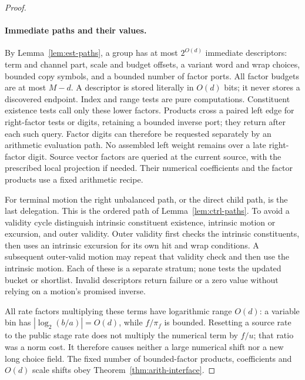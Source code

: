 \begin{proof}
\paragraph{Immediate paths and their values.}
By Lemma~\ref{lem:est-paths}, a group has at most $2^{O(d)}$ immediate
descriptors: term and channel part, scale and budget offsets, a variant
word and wrap choices, bounded copy symbols, and a bounded number of
factor ports.  All factor budgets are at most $M-d$.  A descriptor is
stored literally in $O(d)$ bits; it never stores a discovered endpoint.
Index and range tests are pure computations.  Constituent existence
tests call only these lower factors.  Products cross a paired left
edge for right-factor tests or digits, retaining a bounded inverse
port; they return after each such query.  Factor digits can therefore be
requested separately by an arithmetic evaluation path.  No assembled
left weight remains over a late right-factor digit.  Source vector
factors are queried at the current source, with the prescribed local
projection if needed.  Their numerical coefficients and the factor
products use a fixed arithmetic recipe.

For terminal motion the right unbalanced path, or the direct child
path, is the last delegation.  This is the ordered path of
Lemma~\ref{lem:ctrl-paths}.  To avoid a validity cycle distinguish
intrinsic constituent existence, intrinsic motion or excursion, and
outer validity.  Outer validity first checks the intrinsic constituents,
then uses an intrinsic excursion for its own hit and wrap conditions.
A subsequent outer-valid motion may repeat that validity check and
then use the intrinsic motion.  Each of these is a separate stratum;
none tests the updated bucket or shortlist.  Invalid descriptors return
failure or a zero value without relying on a motion's promised inverse.

All rate factors multiplying these terms have logarithmic range
$O(d)$: a variable bin has $|\log_2(b/a)|=O(d)$, while $f/\pi_f$ is
bounded.  Resetting a source rate to the public stage rate does not
multiply the numerical term by $f/u$; that ratio was a norm cost.
It therefore causes neither a large numerical shift nor a new long
choice field.  The fixed number of bounded-factor products, coefficients
and $O(d)$ scale shifts obey Theorem~\ref{thm:arith-interface}.


\end{proof}
